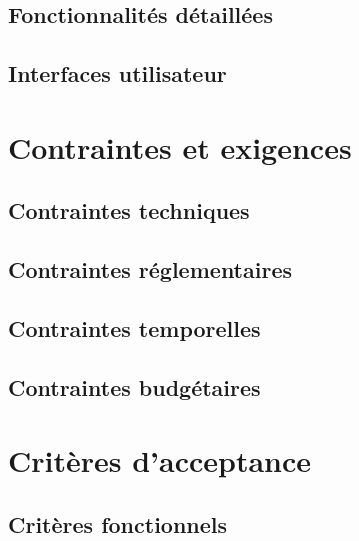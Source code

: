 
\subsection{Fonctionnalités détaillées}


\subsection{Interfaces utilisateur}


\section{Contraintes et exigences}


\subsection{Contraintes techniques}


\subsection{Contraintes réglementaires}


\subsection{Contraintes temporelles}


\subsection{Contraintes budgétaires}


\section{Critères d'acceptance}


\subsection{Critères fonctionnels}

